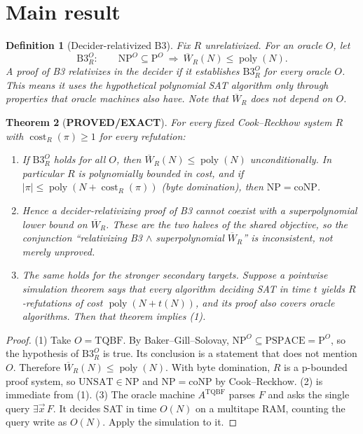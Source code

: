 \documentclass[11pt]{article}
\newtheorem{theorem}{Theorem}
\newtheorem{definition}[theorem]{Definition}
\newcommand{\W}{\overline W}
\begin{document}
\section{Main result}
\begin{definition}[Decider-relativized B3]
Fix $R$ \emph{unrelativized}. For an oracle $O$, let
\[
\mathrm{B3}^{O}_R:\qquad \mathrm{NP}^{O}\subseteq\mathrm P^{O}\ \Longrightarrow\ \W_R(N)\le\operatorname{poly}(N).
\]
A proof of B3 \emph{relativizes in the decider} if it establishes $\mathrm{B3}^O_R$ for every oracle $O$.
This means it uses the hypothetical polynomial SAT algorithm only through properties that
oracle machines also have.
Note that $\W_R$ does not depend on $O$.
\end{definition}

\begin{theorem}[\textbf{PROVED/EXACT}]\label{thm:main}
For every fixed Cook--Reckhow system $R$ with $\operatorname{cost}_R(\pi)\ge 1$ for every refutation:
\begin{enumerate}
\item If $\mathrm{B3}^{O}_R$ holds for all $O$, then $\W_R(N)\le\operatorname{poly}(N)$ unconditionally.
In particular $R$ is polynomially bounded in cost, and if $|\pi|\le\operatorname{poly}(N+\operatorname{cost}_R(\pi))$
(byte domination), then $\mathrm{NP}=\mathrm{coNP}$.
\item Hence a decider-relativizing proof of B3 cannot coexist with a superpolynomial lower bound on $\W_R$.
These are the two halves of the shared objective, so the conjunction ``relativizing B3 $\wedge$ superpolynomial $\W_R$'' is
\emph{inconsistent}, not merely unproved.
\item The same holds for the stronger secondary targets. Suppose a pointwise simulation theorem says that
every algorithm deciding SAT in time $t$ yields $R$-refutations of cost $\operatorname{poly}(N+t(N))$,
and its proof also covers oracle algorithms. Then that theorem implies (1).
\end{enumerate}
\end{theorem}
\begin{proof}
(1) Take $O=\mathrm{TQBF}$. By Baker--Gill--Solovay, $\mathrm{NP}^O\subseteq\mathrm{PSPACE}=\mathrm P^O$, so the
hypothesis of $\mathrm{B3}^O_R$ is true. Its conclusion is a statement that does not mention $O$. Therefore
$\W_R(N)\le\operatorname{poly}(N)$. With byte domination, $R$ is a p-bounded proof system,
so $\mathrm{UNSAT}\in\mathrm{NP}$ and $\mathrm{NP}=\mathrm{coNP}$ by Cook--Reckhow.
(2) is immediate from (1).
(3) The oracle machine $A^{\mathrm{TQBF}}$ parses $F$ and asks the single query $\exists\vec x\,F$.
It decides SAT in time $O(N)$ on a multitape RAM, counting the query write as $O(N)$. Apply the simulation to it.
\end{proof}
\end{document}
